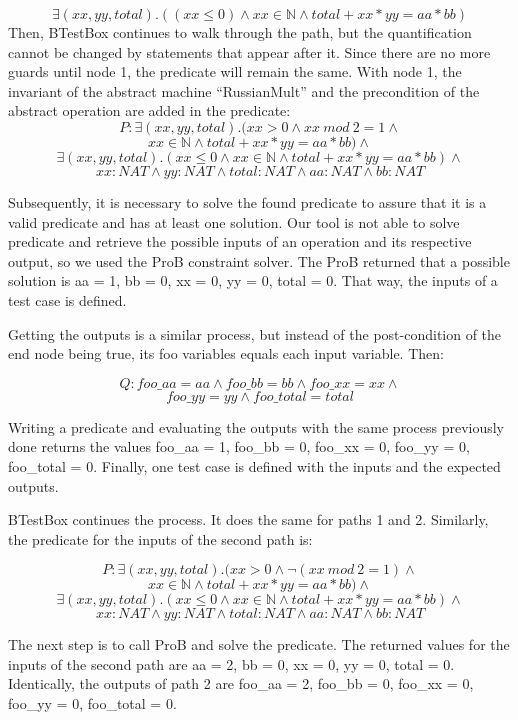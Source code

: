 \documentclass[runningheads]{llncs}
\begin{document}
$$\exists(xx, yy, total).((xx \leq 0) \wedge xx \in \mathbb{N} \wedge total + xx * yy = aa * bb)$$
\nolinebreak[4]  Then, BTestBox continues to walk through the path, but the quantification cannot be changed by statements that appear after it. Since there are no more guards until node 1, the predicate will remain the same. With node 1, the invariant of the abstract machine ``RussianMult'' and the precondition of the abstract operation are added in the predicate: \nolinebreak[4]
\noindent
$$P: \exists(xx, yy, total).(xx > 0 \wedge xx\ mod\ 2 = 1 \wedge$$
$$ xx \in \mathbb{N} \wedge total + xx * yy = aa * bb) \wedge$$
$$\exists(xx, yy, total).(xx \leq 0 \wedge xx \in \mathbb{N} \wedge total + xx * yy = aa * bb) \wedge$$
$$xx : NAT \wedge yy : NAT \wedge total : NAT \wedge aa : NAT \wedge bb : NAT$$ \nolinebreak[4]

Subsequently, it is necessary to solve the found predicate to assure that it is a valid predicate and has at least one solution. Our tool is not able to solve predicate and retrieve the possible inputs of an operation and its respective output, so we used the ProB constraint solver. The ProB returned that a possible solution is aa = 1, bb = 0, xx = 0, yy = 0, total = 0. That way, the inputs of a test case is defined.

Getting the outputs is a similar process, but instead of the post-condition of the end node being true, its foo variables equals each input variable. Then:

$$Q : foo\_aa = aa \wedge foo\_bb = bb \wedge foo\_xx = xx \wedge$$
$$foo\_yy = yy \wedge foo\_total = total$$

Writing a predicate and evaluating the outputs with the same process previously done returns the values foo\_aa = 1, foo\_bb = 0, foo\_xx = 0, foo\_yy = 0, foo\_total = 0. Finally, one test case is defined with the inputs and the expected outputs.

BTestBox continues the process. It does the same for paths 1 and 2. Similarly, the predicate for the inputs of the second path is:

$$P: \exists(xx, yy, total).(xx > 0 \wedge \neg(xx\ mod\ 2 = 1) \wedge$$
$$ xx \in \mathbb{N} \wedge total + xx * yy = aa * bb) \wedge$$
$$\exists(xx, yy, total).(xx \leq 0 \wedge xx \in \mathbb{N} \wedge total + xx * yy = aa * bb) \wedge$$
$$xx : NAT \wedge yy : NAT \wedge total : NAT \wedge aa : NAT \wedge bb : NAT$$

The next step is to call ProB and solve the predicate. The returned values for the inputs of the second path are aa = 2, bb = 0, xx = 0, yy = 0, total = 0. Identically, the outputs of path 2 are foo\_aa = 2, foo\_bb = 0, foo\_xx = 0, foo\_yy = 0, foo\_total = 0.
\end{document}
